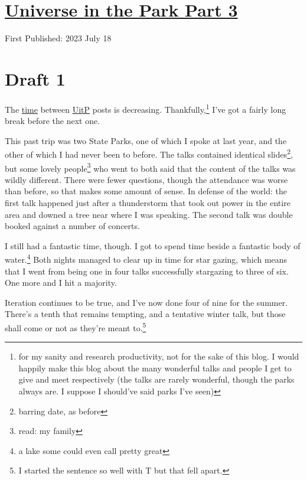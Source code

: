 \documentclass[12pt]{article}[titlepage]
\newcommand{\1}{\={a}}
\newcommand{\2}{\={e}}
\newcommand{\3}{\={\i}}
\newcommand{\4}{\=o}
\newcommand{\5}{\=u}
\newcommand{\6}{\={A}}
\renewcommand{\,}{\textsuperscript{,}}
\begin{document}
\doublespacing
\section{\href{universe-3.html}{Universe in the Park Part 3}}
First Published: 2023 July 18
\section{Draft 1}
The \href{universe.html}{time} between \href{universe-2.html}{UitP} posts is decreasing.
Thankfully,\footnote{for my sanity and research productivity, not for the sake of this blog. I would happily make this blog about the many wonderful talks and people I get to give and meet respectively (the talks are rarely wonderful, though the parks always are. I suppose I should've said parks I've seen)}
I've got a fairly long break before the next one.

This past trip was two State Parks, one of which I spoke at last year, and the other of which I had never been to before.
The talks contained identical slides\footnote{barring date, as before}, but some lovely people\footnote{read: my family} who went to both said that the content of the talks was wildly different.
There were fewer questions, though the attendance was worse than before, so that makes some amount of sense.
In defense of the world: the first talk happened just after a thunderstorm that took out power in the entire area and downed a tree near where I was speaking.
The second talk was double booked against a number of concerts.

I still had a fantastic time, though.
I got to spend time beside a fantastic body of water.\footnote{a lake some could even call pretty great}
Both nights managed to clear up in time for star gazing, which means that I went from being one in four talks successfully stargazing to three of six.
One more and I hit a majority.

Iteration continues to be true, and I've now done four of nine for the summer.
There's a tenth that remains tempting, and a tentative winter talk, but those shall come or not as they're meant to.\footnote{I started the sentence so well with T but that fell apart.}
\end{document}
